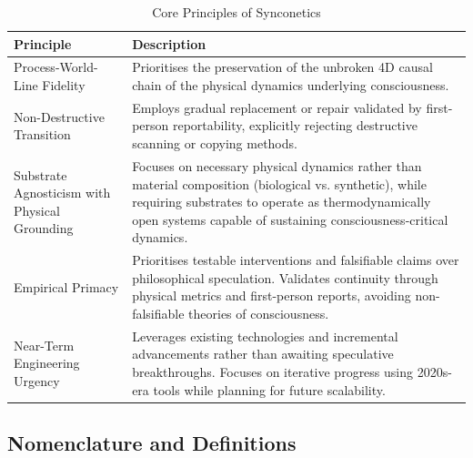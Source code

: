 \documentclass[10pt]{article}
\begin{document}
\begin{sloppypar}
  \begin{table}[ht!]
    \centering
    \begin{tabular}{p{}p{}}
      \toprule
      \textbf{Principle}                            & \textbf{Description}                                                                                                                                                                                                               \\
      \midrule
      Process-World-Line Fidelity                   & Prioritises the preservation of the unbroken 4D causal chain of the physical dynamics underlying consciousness.                                                                                                                    \\
      \midrule
      Non-Destructive Transition                    & Employs gradual replacement or repair validated by first-person reportability, explicitly rejecting destructive scanning or copying methods.                                                                                       \\
      \midrule
      Substrate Agnosticism with Physical Grounding & Focuses on necessary physical dynamics rather than material composition (biological vs. synthetic), while requiring substrates to operate as thermodynamically open systems capable of sustaining consciousness-critical dynamics. \\
      \midrule
      Empirical Primacy                             & Prioritises testable interventions and falsifiable claims over philosophical speculation. Validates continuity through physical metrics and first-person reports, avoiding non-falsifiable theories of consciousness.              \\
      \midrule
      Near-Term Engineering Urgency                 & Leverages existing technologies and incremental advancements rather than awaiting speculative breakthroughs. Focuses on iterative progress using 2020s-era tools while planning for future scalability.                            \\
      \bottomrule
    \end{tabular}
    \caption{Core Principles of Synconetics}
    \label{tab:synconetics-principles}
  \end{table}

  \subsection{Nomenclature and Definitions}
  \label{sec:nomenclature}


\end{sloppypar}
\end{document}
